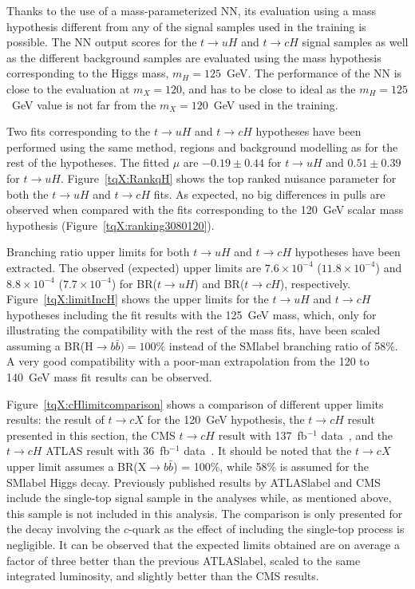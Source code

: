 Thanks to the use of a mass-parameterized NN, its evaluation using a mass hypothesis different from any of the signal samples used in the training is possible. The NN output scores for the $t\to uH$ and $t\to cH$ signal samples as well as the different background samples are evaluated using the mass hypothesis corresponding to the Higgs mass, $m_H=125$~GeV. The performance of the NN is close to the evaluation at $m_X=120$, and has to be close to ideal as the $m_H=125$~GeV value is not far from the $m_X=120$~GeV used in the training.

Two fits corresponding to the $t\to uH$ and $t\to cH$ hypotheses have been performed using the same method, regions and background modelling as for the rest of the hypotheses. The fitted $\mu$ are $-0.19\pm0.44$ for $t\to uH$ and $0.51\pm0.39$ for $t\to uH$. Figure~\ref{tqX:RankqH} shows the top ranked nuisance parameter for both the $t\to uH$ and $t\to cH$ fits. As expected, no big differences in pulls are observed when compared with the fits corresponding to the 120~GeV scalar mass hypothesis (Figure~\ref{tqX:ranking3080120}).

Branching ratio upper limits for both $t\to uH$ and $t\to cH$ hypotheses have been extracted. The observed (expected) upper limits are $7.6\times10^{-4}$ ($11.8\times10^{-4}$) and $8.8\times10^{-4}$ ($7.7\times10^{-4}$) for BR($t\to uH$) and BR($t\to cH$), respectively. Figure~\ref{tqX:limitIncH} shows the upper limits for the $t\to uH$ and $t\to cH$ hypotheses including the fit results with the 125~GeV mass, which, only for illustrating the compatibility with the rest of the mass fits, have been scaled assuming a BR(H$\rightarrow b \bar{b}) = 100\%$ instead of the \acrshort{SMlabel} branching ratio of 58\%. A very good compatibility with a poor-man extrapolation from the 120 to 140~GeV mass fit results can be observed.

Figure~\ref{tqX:cHlimitcomparison} shows a comparison of different upper limits results: the result of $t\to cX$ for the 120~GeV hypothesis, the $t\to cH$ result presented in this section, the CMS $t\to cH$ result with 137~fb$^{-1}$ data~\cite{CMS-TOP-19-002-pas}, and the $t\to cH$ ATLAS result with 36~fb$^{-1}$ data~\cite{ATLAS:2018jqi}. It should be noted that the $t\to cX$ upper limit assumes a BR(X$\rightarrow b \bar{b}$) = 100\%, while 58\% is assumed for the \acrshort{SMlabel} Higgs decay. Previously published results by \acrshort{ATLASlabel} and CMS include the single-top signal sample in the analyses while, as mentioned above, this sample is not included in this analysis. The comparison is only presented for the decay involving the $c$-quark as the effect of including the single-top process is negligible. It can be observed that the expected limits obtained are on average a factor of three better than the previous \acrshort{ATLASlabel}, scaled to the same integrated luminosity, and slightly better than the CMS results.

